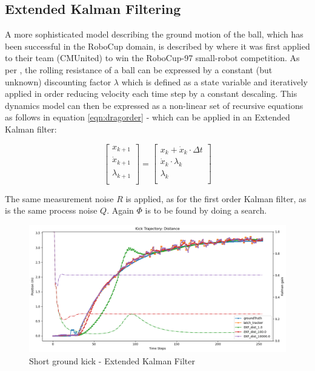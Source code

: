 \documentclass[a4paper,twoside,12pt]{report}
\begin{document}
\subsection{Extended Kalman Filtering}

A more sophisticated model describing the ground motion of the ball, which has been successful in the RoboCup domain, is described by \cite{kalmanmodel} where it was first applied to their team (CMUnited) to win the RoboCup-97 small-robot competition. As per \cite{kalmanmodel}, the rolling resistance of a ball can be expressed by a constant (but unknown) discounting factor $\lambda$ which is defined as a state variable and iteratively applied in order reducing velocity each time step by a constant descaling. This dynamics model can then be expressed as a non-linear set of recursive equations as follows in equation \ref{eqn:dragorder} - which can be applied in an Extended Kalman filter:

\begin{equation} 
\begin{bmatrix}
    x_{k+1} \\
    \dot{x}_{k+1} \\
	\lambda_{k+1} \\
\end{bmatrix}
=
\begin{bmatrix}
    x_{k} + \dot{x}_{k} \cdot \Delta t\\
    \dot{x}_{k} \cdot \lambda_{k} \\
	\lambda_{k} \\
\end{bmatrix}
\label{eqn:dragorder}
\end{equation}

The same measurement noise $R$ is applied, as for the first order Kalman filter, as is the same process noise $Q$. Again $\Phi$ is to be found by doing a search.

\begin{figure}[h!]
\begin{center}
\includegraphics[width=12cm]{images/ekf_ground_short.png}
\caption{Short ground kick - Extended Kalman Filter}
\label{fig:ekfgroundshort}
\end{center}
\end{figure}
\end{document}
